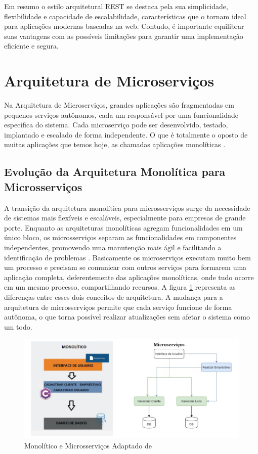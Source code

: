 \documentclass[12pt]{article}
\begin{document}
	Em resumo o estilo arquitetural REST se destaca pela sua simplicidade, flexibilidade e capacidade de escalabilidade, características que o tornam ideal para aplicações modernas baseadas na web. Contudo, é importante equilibrar suas vantagens com as possíveis limitações para garantir uma implementação eficiente e segura.

	
	\section{Arquitetura de Microserviços}
	
	Na Arquitetura de Microserviços, grandes aplicações são fragmentadas em pequenos serviços autônomos, cada um responsável por uma funcionalidade específica do sistema. Cada microserviço pode ser desenvolvido, testado, implantado e escalado de forma independente. O que é totalmente o oposto de muitas aplicações que temos hoje, as chamadas aplicações monolíticas \cite{newman2015}.
	
	
	\subsection{Evolução da Arquitetura Monolítica para Microsserviços}
	
	A transição da arquitetura monolítica para microsserviços surge da necessidade de sistemas mais flexíveis e escaláveis, especialmente para empresas de grande porte. Enquanto as arquiteturas monolíticas agregam funcionalidades em um único bloco, os microsserviços separam as funcionalidades em componentes independentes, promovendo uma manutenção mais ágil e facilitando a identificação de problemas \cite{castro2021}. Basicamente os microserviços executam muito bem um processo e precisam se comunicar com outros serviços para formarem uma aplicação completa, deferentemente das aplicações monolíticas, onde tudo ocorre em um mesmo processo, compartilhando recursos\cite{garcia2021}. A figura \ref{fig:exampleFig1} representa as diferenças entre esses dois conceitos de arquitetura.  
	A mudança para a arquitetura de microsserviços permite que cada serviço funcione de forma autônoma, o que torna possível realizar atualizações sem afetar o sistema como um todo.
	
	\begin{figure}[ht]
		\centering
		\includegraphics[width=1\textwidth]{./img/monolito-e-microservicos.png}
		\caption{Monolítico e Microsserviços
			Adaptado de \cite{garcia2021}}
		\label{fig:exampleFig1}
	\end{figure}
	
\end{document}
